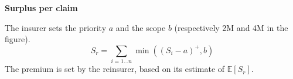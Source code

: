 \begin{f}
\textbf{Surplus per claim}
	
The insurer sets the priority \(a\) and the scope \(b\) (respectively 2M\EUR{} and 4M\EUR{} in the figure).
\[
S_r= \sum_{i=1\ldots n} \min\left( \left( S_i-a\right)^+,b\right)  
\]
The premium is set by the reinsurer, based on its estimate of \(\mathbb{E}[S_r]\).


\end{f}
